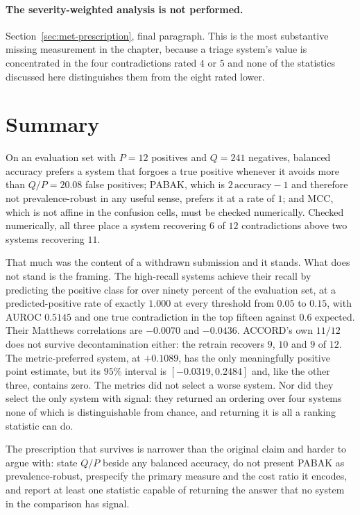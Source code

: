 \paragraph{The severity-weighted analysis is not performed.}
Section~\ref{sec:met-prescription}, final paragraph. This is the most
substantive missing measurement in the chapter, because a triage system's value
is concentrated in the four contradictions rated $4$ or $5$ and none of the
statistics discussed here distinguishes them from the eight rated lower.

\section{Summary}
\label{sec:met-summary}

On an evaluation set with $P = 12$ positives and $Q = 241$ negatives, balanced
accuracy prefers a system that forgoes a true positive whenever it avoids more
than $Q/P = 20.08$ false positives; PABAK, which is $2\,\mathrm{accuracy} - 1$
and therefore not prevalence-robust in any useful sense, prefers it at a rate of
$1$; and MCC, which is not affine in the confusion cells, must be checked
numerically. Checked numerically, all three place a system recovering $6$ of
$12$ contradictions above two systems recovering $11$.

That much was the content of a withdrawn submission and it stands. What does not
stand is the framing. The high-recall systems achieve their recall by predicting
the positive class for over ninety percent of the evaluation set, at a
predicted-positive rate of exactly $1.000$ at every threshold from $0.05$ to
$0.15$, with AUROC $0.5145$ and one true contradiction in the top fifteen against
$0.6$ expected. Their Matthews correlations are $-0.0070$ and $-0.0436$. ACCORD's
own $11/12$ does not survive decontamination either: the retrain recovers $9$,
$10$ and $9$ of $12$. The metric-preferred system, at $+0.1089$, has the only
meaningfully positive point estimate, but its $95\%$ interval is
$[-0.0319, 0.2484]$ and, like the other three, contains zero. The metrics did not
select a worse system. Nor did they select the only system with signal: they
returned an ordering over four systems none of which is distinguishable from
chance, and returning it is all a ranking statistic can do.

The prescription that survives is narrower than the original claim and harder to
argue with: state $Q/P$ beside any balanced accuracy, do not present PABAK as
prevalence-robust, prespecify the primary measure and the cost ratio it encodes,
and report at least one statistic capable of returning the answer that no system
in the comparison has signal.
